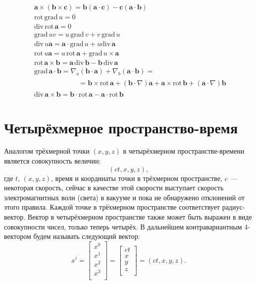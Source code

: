 \documentclass[a4paper,14pt]{extreport} %
\renewcommand{\vec}[1]{\boldsymbol{#1}}
\renewcommand{\div}{\mathrm{div}\,}
\newcommand{\rot}{\mathrm{rot}\,}
\newcommand{\grad}{\mathrm{grad}\,}
\begin{document}
	\begin{align*}
		& \vec{a}\times(\vec{b}\times\vec{c}) = \vec{b} (\vec{a}\cdot\vec{c}) - \vec{c} (\vec{a}\cdot\vec{b})\\
		& \rot \grad u = 0\\
		& \div \rot \vec{a} = 0\\
		& \grad uv = u\, \grad v + v\, \grad u\\
		& \div u \vec{a} = \vec{a} \cdot \grad u + u \div \vec{a}\\
		& \rot u\vec{a} = u\, \rot \vec{a} + \grad u \times \vec{a}\\
		& \rot \vec{a}\times\vec{b} = \vec{a}\, \div \vec{b} - \vec{b}\, \div \vec{a}\\
		&\grad \vec{a} \cdot \vec{b} = \nabla_a(\vec{b}\cdot\vec{a}) + \nabla_b(\vec{a}\cdot\vec{b}) = \\
		&\begin{gathered} 
			\qquad \qquad \qquad = \vec{b}\times\rot \vec{a} + (\vec{b}\cdot\nabla)\vec{a} + \vec{a}\times\rot \vec{b} + (\vec{a}\cdot\nabla)\vec{b}
		\end{gathered} \\
		& \div \vec{a}\times\vec{b} = \vec{b}\cdot \rot \vec{a} - \vec{a}\cdot \rot \vec{b}
	\end{align*}
	
	\chapter{Четырёхмерное пространство-время}
	
	Аналогом трёхмерной точки $(x, y, z)$ в четырёхмерном пространстве-времени является совокупность величин:
	\[
	(ct, x ,y, z),
	\]
	где $t$, $(x, y, z)$, время и координаты точки в трёхмерном пространстве, $c$~--- некоторая скорость, сейчас в качестве этой скорости выступает скорость электромагнитных волн (света) в вакууме и пока не обнаружено отклонений от этого правила. Каждой точке в трёхмерном пространстве соответствует радиус-вектор. Вектор в четырёхмерном пространстве также может быть выражен в виде совокупности чисел, только теперь четырёх. В дальнейшем контравариантным 4-вектором будем называть следующий вектор:
	\[
		x^i = 
		\begin{bmatrix}
			x^0 \\
			x^1 \\
			x^2 \\
			x^3 \\
		\end{bmatrix}
		=
		\begin{bmatrix}
			ct \\
			x \\
			y \\
			z \\
		\end{bmatrix} = (ct, x ,y, z).
	\] 
\end{document}
